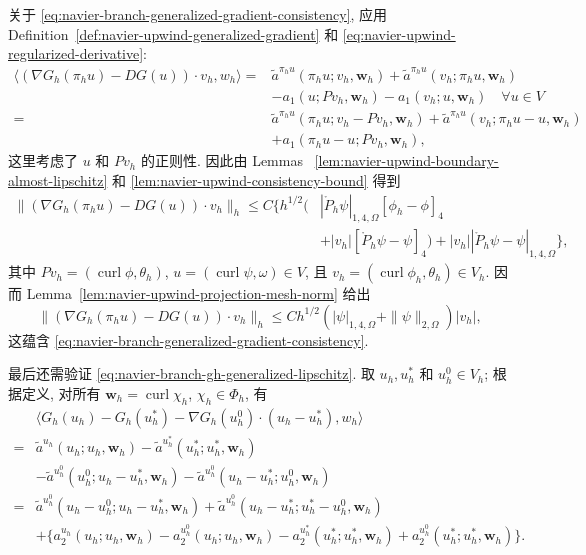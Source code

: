 关于 \eqref{eq:navier-branch-generalized-gradient-consistency}, 应用
Definition~\ref{def:navier-upwind-generalized-gradient} 和
\eqref{eq:navier-upwind-regularized-derivative}:
\[
\begin{aligned}
\langle(\nabla G_h(\pi_hu)-DG(u))\cdot v_h,w_h\rangle
={}&\widetilde a^{\pi_hu}(\pi_hu;v_h,\boldsymbol w_h)
+\widetilde a^{\pi_hu}(v_h;\pi_hu,\boldsymbol w_h)\\
&-a_1(u;Pv_h,\boldsymbol w_h)-a_1(v_h;u,\boldsymbol w_h)
\quad\forall u\in V\\
={}&\widetilde a^{\pi_hu}(\pi_hu;v_h-Pv_h,\boldsymbol w_h)
+\widetilde a^{\pi_hu}(v_h;\pi_hu-u,\boldsymbol w_h)\\
&+a_1(\pi_hu-u;Pv_h,\boldsymbol w_h),
\end{aligned}
\]
这里考虑了 $u$ 和 $Pv_h$ 的正则性. 因此由 Lemmas~
\ref{lem:navier-upwind-boundary-almost-lipschitz} 和
\ref{lem:navier-upwind-consistency-bound} 得到
\[
\begin{aligned}
\| (\nabla G_h(\pi_hu)-DG(u))\cdot v_h\|_h
\leq C\{h^{1/2}(&|\mathring P_h\psi|_{1,4,\Omega}[\phi_h-\phi]_4\\
&+|v_h|[\mathring P_h\psi-\psi]_4)
+|v_h||\mathring P_h\psi-\psi|_{1,4,\Omega}\},
\end{aligned}
\]
其中 $Pv_h=(\operatorname{curl}\phi,\theta_h)$,
$u=(\operatorname{curl}\psi,\omega)\in V$, 且
$v_h=(\operatorname{curl}\phi_h,\theta_h)\in V_h$. 因而
Lemma~\ref{lem:navier-upwind-projection-mesh-norm} 给出
\[
\|(\nabla G_h(\pi_hu)-DG(u))\cdot v_h\|_h
\leq Ch^{1/2}(|\psi|_{1,4,\Omega}+\|\psi\|_{2,\Omega})|v_h|,
\]
这蕴含 \eqref{eq:navier-branch-generalized-gradient-consistency}.

最后还需验证 \eqref{eq:navier-branch-gh-generalized-lipschitz}.
取 $u_h,u_h^*$ 和 $u_h^0\in V_h$; 根据定义, 对所有
$\boldsymbol w_h=\operatorname{curl}\chi_h$, $\chi_h\in\Phi_h$, 有
\[
\begin{aligned}
&\langle G_h(u_h)-G_h(u_h^*)
-\nabla G_h(u_h^0)\cdot(u_h-u_h^*),w_h\rangle\\
={}&\widetilde a^{u_h}(u_h;u_h,\boldsymbol w_h)
-\widetilde a^{u_h^*}(u_h^*;u_h^*,\boldsymbol w_h)\\
&-\widetilde a^{u_h^0}(u_h^0;u_h-u_h^*,\boldsymbol w_h)
-\widetilde a^{u_h^0}(u_h-u_h^*;u_h^0,\boldsymbol w_h)\\
={}&\widetilde a^{u_h^0}(u_h-u_h^0;u_h-u_h^*,\boldsymbol w_h)
+\widetilde a^{u_h^0}(u_h-u_h^*;u_h^*-u_h^0,\boldsymbol w_h)\\
&+\{a_2^{u_h}(u_h;u_h,\boldsymbol w_h)
-a_2^{u_h^0}(u_h;u_h,\boldsymbol w_h)
-a_2^{u_h^*}(u_h^*;u_h^*,\boldsymbol w_h)
+a_2^{u_h^0}(u_h^*;u_h^*,\boldsymbol w_h)\}.
\end{aligned}
\]

